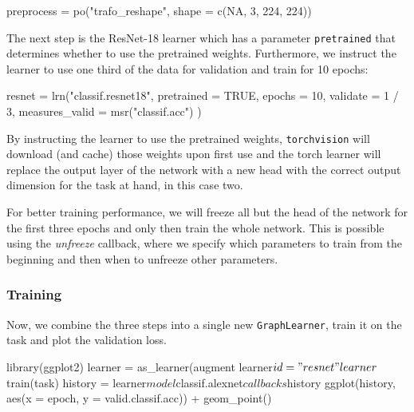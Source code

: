\documentclass[article, nojss]{jss}
\theoremstyle{definition}
\begin{document}
\begin{CodeInput}
preprocess = po("trafo_reshape", shape = c(NA, 3, 224, 224))
\end{CodeInput}

The next step is the ResNet-18 learner which has a parameter \texttt{pretrained} that determines whether to use the pretrained weights.
Furthermore, we instruct the learner to use one third of the data for validation and train for 10 epochs:

\begin{CodeInput}
resnet = lrn("classif.resnet18",
  pretrained = TRUE,
  epochs = 10,
  validate = 1 / 3,
  measures_valid = msr("classif.acc")
)
\end{CodeInput}



By instructing the learner to use the pretrained weights, \texttt{torchvision} will download (and cache) those weights upon first use and the torch learner will replace the output layer of the network with a new head with the correct output dimension for the task at hand, in this case two.

For better training performance, we will freeze all but the head of the network for the first three epochs and only then train the whole network.
This is possible using the \emph{unfreeze} callback, where we specify which parameters to train from the beginning and then when to unfreeze other parameters.


\subsubsection{Training}

Now, we combine the three steps into a single new \texttt{GraphLearner}, train it on the task and plot the validation loss.

\begin{CodeInput}
library(ggplot2)
learner = as_learner(augment %
learner$id = "resnet"
learner$train(task)
history = learner$model$classif.alexnet$callbacks$history
ggplot(history, aes(x = epoch, y = valid.classif.acc)) + 
  geom_point()
\end{CodeInput}
\end{document}
